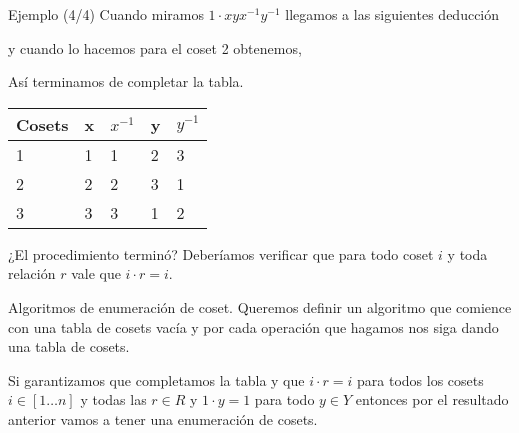 \documentclass[aspectratio=169, 9pt]{beamer}
\newcommand{\In}{[1 \dots n]}
\begin{document}
\begin{frame}[fragile]{Ejemplo (4/4)}
	Cuando miramos $1 \cdot xyx^{-1}y^{-1}$ llegamos a las siguientes deducción
	\pause
	\begin{center}
	\end{center}
	\pause
	y cuando lo hacemos para el coset 2 obtenemos,
	\begin{center}
	\end{center}
	\pause
	Así terminamos de completar la tabla.
	
	\begin{table}[]
		\begin{tabular}{|l|l|l|l|l|}
			\hline
			Cosets     & x          & $x^{-1}$          & y          & $y^{-1}$          \\ \hline
			{1} & {1} & {1} & {2} & {3} \\ \hline
			{2} & {2} & {2} & {3} & {1} \\ \hline
			{3} & {3} & {3} & {1} & {2} \\ \hline
		\end{tabular}
	\end{table}
	
	
	
	
	
	¿El procedimiento terminó? 
	\pause
	Deberíamos verificar que para todo coset $i$ y toda relación $r$ vale que $i \cdot r = i$.

\end{frame}


\begin{frame}[fragile]{Algoritmos de enumeración de coset.}
	Queremos definir un algoritmo que comience con una tabla de cosets vacía y por cada operación que hagamos nos siga dando una tabla de cosets.
	
	\pause
	Si garantizamos que completamos la tabla y que $i \cdot r = i$ para todos los cosets $i \in \In$ y todas las $r \in R$ y $1 \cdot y = 1$ para todo $y \in Y$ entonces por el resultado anterior vamos a tener una enumeración de cosets.
	
\end{frame}
\end{document}
